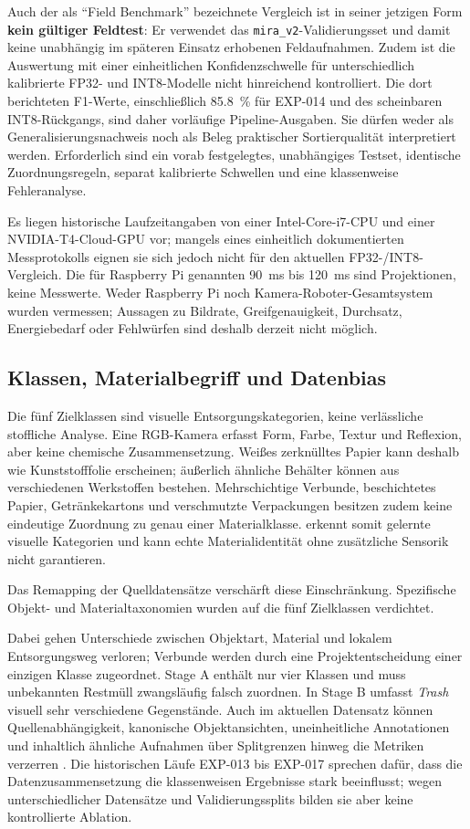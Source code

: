 Auch der als \enquote{Field Benchmark} bezeichnete Vergleich ist in seiner jetzigen Form \textbf{kein gültiger Feldtest}: Er verwendet das \texttt{mira\_v2}-Validierungsset und damit keine unabhängig im späteren Einsatz erhobenen Feldaufnahmen. Zudem ist die Auswertung mit einer einheitlichen Konfidenzschwelle für unterschiedlich kalibrierte FP32- und INT8-Modelle nicht hinreichend kontrolliert. Die dort berichteten F1-Werte, einschließlich \SI{85.8}{\percent} für EXP-014 und des scheinbaren INT8-Rückgangs, sind daher vorläufige Pipeline-Ausgaben. Sie dürfen weder als Generalisierungsnachweis noch als Beleg praktischer Sortierqualität interpretiert werden. Erforderlich sind ein vorab festgelegtes, unabhängiges Testset, identische Zuordnungsregeln, separat kalibrierte Schwellen und eine klassenweise Fehleranalyse.

Es liegen historische Laufzeitangaben von einer Intel-Core-i7-CPU und einer NVIDIA-T4-Cloud-GPU vor; mangels eines einheitlich dokumentierten Messprotokolls eignen sie sich jedoch nicht für den aktuellen FP32-/INT8-Vergleich. Die für Raspberry Pi genannten \SI{90}{\milli\second} bis \SI{120}{\milli\second} sind Projektionen, keine Messwerte. Weder Raspberry Pi noch Kamera-Roboter-Gesamtsystem wurden vermessen; Aussagen zu Bildrate, Greifgenauigkeit, Durchsatz, Energiebedarf oder Fehlwürfen sind deshalb derzeit nicht möglich.

\subsection{Klassen, Materialbegriff und Datenbias}
Die fünf Zielklassen sind visuelle Entsorgungskategorien, keine verlässliche stoffliche Analyse. Eine RGB-Kamera erfasst Form, Farbe, Textur und Reflexion, aber keine chemische Zusammensetzung. Weißes zerknülltes Papier kann deshalb wie Kunststofffolie erscheinen; äußerlich ähnliche Behälter können aus verschiedenen Werkstoffen bestehen. Mehrschichtige Verbunde, beschichtetes Papier, Getränkekartons und verschmutzte Verpackungen besitzen zudem keine eindeutige Zuordnung zu genau einer Materialklasse. \mira erkennt somit gelernte visuelle Kategorien und kann echte Materialidentität ohne zusätzliche Sensorik nicht garantieren.

Das Remapping der Quelldatensätze verschärft diese Einschränkung. Spezifische Objekt- und Materialtaxonomien wurden auf die fünf Zielklassen verdichtet.

Dabei gehen Unterschiede zwischen Objektart, Material und lokalem Entsorgungsweg verloren; Verbunde werden durch eine Projektentscheidung einer einzigen Klasse zugeordnet. Stage A enthält nur vier Klassen und muss unbekannten Restmüll zwangsläufig falsch zuordnen. In Stage B umfasst \textit{Trash} visuell sehr verschiedene Gegenstände. Auch im aktuellen Datensatz können Quellenabhängigkeit, kanonische Objektansichten, uneinheitliche Annotationen und inhaltlich ähnliche Aufnahmen über Splitgrenzen hinweg die Metriken verzerren \cite{ben2010domain}. Die historischen Läufe EXP-013 bis EXP-017 sprechen dafür, dass die Datenzusammensetzung die klassenweisen Ergebnisse stark beeinflusst; wegen unterschiedlicher Datensätze und Validierungssplits bilden sie aber keine kontrollierte Ablation.


